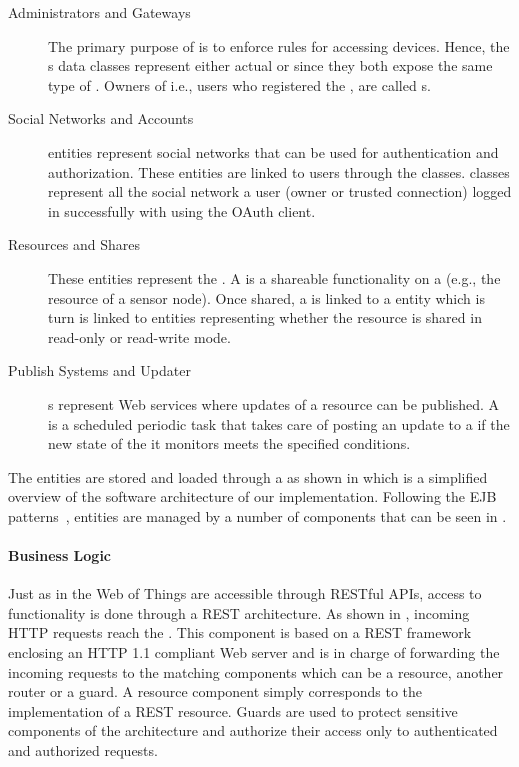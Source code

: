 \begin{description}
  \item[Administrators and Gateways] The primary purpose of \sac{} is to enforce rules for accessing \WoT{} devices. Hence, the s data classes represent either actual \sgs{} or \sts{} since they both expose the same type of \devLayer{}. Owners of \sts{} i.e., users who registered the \sts{}, are called s.
  
  \item[Social Networks and Accounts]  entities represent social networks that can be used for authentication and authorization. These entities are linked to users through the  classes.  classes represent all the social network a user (owner or trusted connection) logged in successfully with using the \sac{} OAuth client.

  \item[Resources and Shares] These entities represent the \sts{}. A  is a shareable functionality on a \st{} (e.g., the  resource of a sensor node). Once shared, a  is linked to a  entity which is turn is linked to  entities representing whether the resource is shared in read-only or read-write mode.

  \item[Publish Systems and Updater] s represent Web services where updates of a resource can be published. A  is a scheduled periodic task that takes care of posting an update to a  if the new state of the  it monitors meets the specified conditions.
\end{description} 

The entities are stored and loaded through a  as shown in  which is a simplified overview of the software architecture of our \sac{} implementation. Following the EJB patterns~\cite{Monson-Haefel2006}, entities are managed by a number of  components that can be seen in .

\paragraph{Business Logic} Just as \sts{} in the Web of Things are accessible through RESTful APIs, access to \sac{} functionality is done through a REST architecture. As shown in , incoming HTTP requests reach the . This component is based on a REST framework enclosing an HTTP 1.1 compliant Web server and is in charge of forwarding the incoming requests to the matching components which can be a resource, another router or a guard. A resource component simply corresponds to the implementation of a REST resource. Guards are used to protect sensitive components of the architecture and authorize their access only to authenticated and authorized requests.

